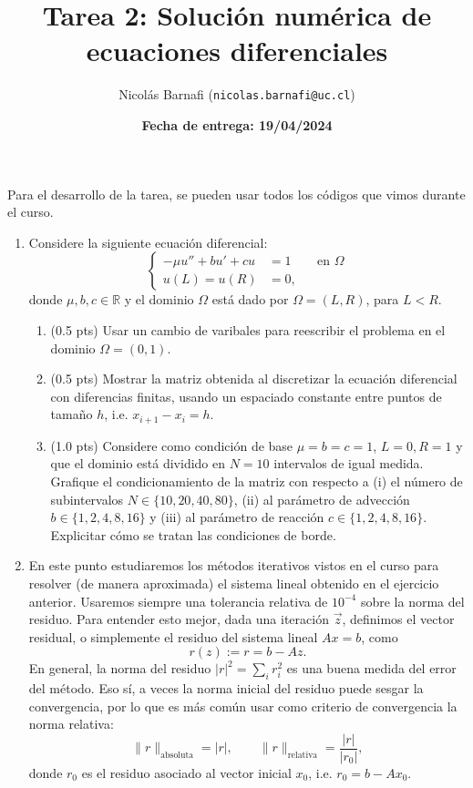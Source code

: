 \documentclass{article}
\title{Tarea 2: Solución numérica de ecuaciones diferenciales}
\author{Nicolás Barnafi (\texttt{nicolas.barnafi@uc.cl})}
\date{\textbf{Fecha de entrega: 19/04/2024}}
\begin{document}
\maketitle

Para el desarrollo de la tarea, se pueden usar todos los códigos que vimos durante el curso.

\begin{enumerate}
    \item Considere la siguiente ecuación diferencial: 
        $$
            \left\lbrace\begin{aligned}
                - \mu u'' + b u' + c u &= 1 && \text{en $\Omega$}\\
                u(L) = u(R) &= 0,
            \end{aligned}\right.
        $$
        donde $\mu, b,c\in \mathbb R$ y el dominio $\Omega$ está dado por $\Omega = (L, R)$, para $ L < R$. 
        \begin{enumerate}
            \item (0.5 pts) Usar un cambio de varibales para reescribir el problema en el dominio $\Omega = (0,1)$.
            \item (0.5 pts) Mostrar la matriz obtenida al discretizar la ecuación diferencial con diferencias finitas, usando un espaciado constante entre puntos de tamaño $h$, i.e. $x_{i+1} - x_i = h$.
            \item (1.0 pts) Considere como condición de base $\mu=b=c=1$, $L=0, R=1$ y que el dominio está dividido en $N=10$ intervalos de igual medida. Grafique el condicionamiento de la matriz con respecto a (i) el número de subintervalos $N\in \{10,20,40,80\}$, (ii) al parámetro de advección $b \in\{1, 2, 4, 8, 16\}$ y (iii) al parámetro de reacción $c\in\{1, 2, 4, 8, 16\}$. Explicitar cómo se tratan las condiciones de borde.
        \end{enumerate} 

    \item En este punto estudiaremos los métodos iterativos vistos en el curso para resolver (de manera aproximada) el sistema lineal obtenido en el ejercicio anterior. Usaremos siempre una tolerancia relativa de $10^{-4}$ sobre la norma del residuo. Para entender esto mejor, dada una iteración $\vec z$, definimos el vector residual, o simplemente el residuo del sistema lineal $Ax = b$, como 
            $$ r(z) := r = b - Az. $$
    En general, la norma del residuo $|r|^2 = \sum_i r_i^2$ es una buena medida del error del método. Eso sí, a veces la norma inicial del residuo puede sesgar la convergencia, por lo que es más común usar como criterio de convergencia la norma relativa: 
        $$ \|r\|_\text{absoluta} = |r|, \qquad \|r\|_\text{relativa} = \frac{|r|}{|r_0|}, $$
    donde $r_0$ es el residuo asociado al vector inicial $x_0$, i.e. $r_0 = b - Ax_0$. 


\end{enumerate}
\end{document}
